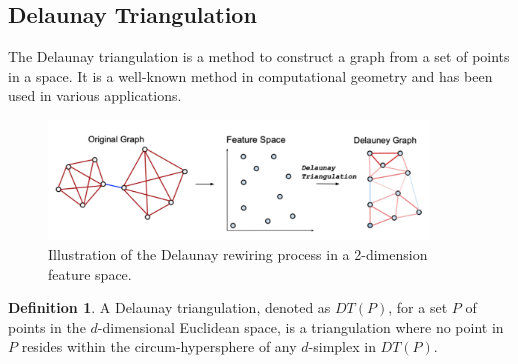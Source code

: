 \documentclass{article}
\theoremstyle{plain}
\theoremstyle{definition}
\newtheorem{definition}[theorem]{Definition}
\theoremstyle{remark}
\begin{document}
\subsection{Delaunay Triangulation}
The Delaunay triangulation is a method to construct a graph from a set of points in a space.
It is a well-known method in computational geometry and has been used in various applications.

\label{app:delaunay}
\begin{figure}[h!]
    \center

    \includegraphics[width=0.9\textwidth]{figures/delaunay_process.png}
    \caption{Illustration of the Delaunay rewiring process in a 2-dimension feature space.}
    \label{fig:delaunay_full}
\end{figure}
\begin{definition}
    \label{def:delaunay}
A Delaunay triangulation, denoted as $DT(P)$, for a set $P$ of points 
        in the $d$-dimensional Euclidean space, is a triangulation where no 
        point in $P$ resides within the circum-hypersphere of any $d$-simplex 
        in $DT(P)$.
    \end{definition}

\end{document}
